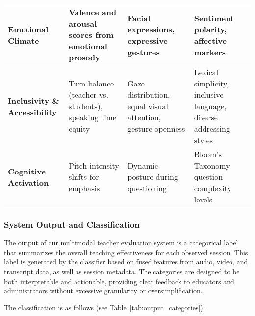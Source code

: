 \begin{table*}[htbp]
\begin{tabularx}{\textwidth}{|>{\raggedright\arraybackslash}X|>{\raggedright\arraybackslash}X|>{\raggedright\arraybackslash}X|>{\raggedright\arraybackslash}X|}
	\textbf{Emotional Climate} & 
Valence and arousal scores from emotional prosody \cite{dmello2012multimodal} & 
Facial expressions, expressive gestures \cite{mcneill1992hand, ochoa2016multimodal} & 
Sentiment polarity, affective markers \cite{dmello2012multimodal} \\
\hline

	\textbf{Inclusivity \& Accessibility} & 
Turn balance (teacher vs. students), speaking time equity & 
Gaze distribution, equal visual attention, gesture openness \cite{fugate2010gaze} & 
Lexical simplicity, inclusive language, diverse addressing styles \cite{Steinberg2021, Heffernan2022} \\
\hline

	\textbf{Cognitive Activation} & 
Pitch intensity shifts for emphasis & 
Dynamic posture during questioning & 
Bloom's Taxonomy question complexity levels \cite{graesser2005question, chi1989self} \\
\hline

\end{tabularx}
\end{table*}


\subsubsection{System Output and Classification}

The output of our multimodal teacher evaluation system is a categorical label that summarizes the overall teaching effectiveness for each observed session. This label is generated by the classifier based on fused features from audio, video, and transcript data, as well as session metadata. The categories are designed to be both interpretable and actionable, providing clear feedback to educators and administrators without excessive granularity or oversimplification.

The classification is as follows (see Table~\ref{tab:output_categories}):

